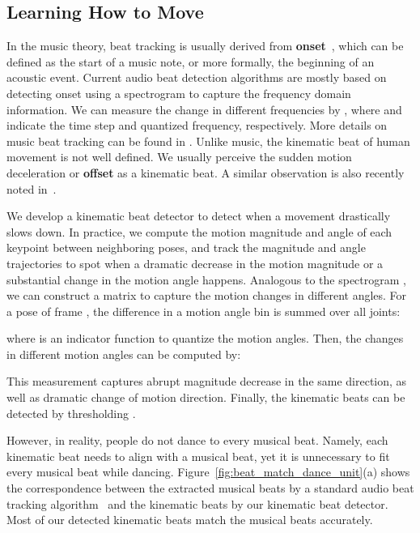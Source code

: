 \documentclass{article}
\newlength\secmargin
\newlength\subsecmargin
\begin{document}
\subsection{Learning How to Move}
\label{subsec:stage1}
\vspace{\subsecmargin}
In the music theory, beat tracking is usually derived from \textbf{onset}~\cite{ellis2007beat}, which can be defined as the start of a music note, or more formally, the beginning of an acoustic event. 
Current audio beat detection algorithms are mostly based on detecting onset using a spectrogram  to capture the frequency domain information.
We can measure the change in different frequencies by , where  and  indicate the time step and quantized frequency, respectively.
More details on music beat tracking can be found in \cite{ellis2007beat}. Unlike music, the kinematic beat of human movement is not well defined.
We usually perceive the sudden motion deceleration or \textbf{offset} as a kinematic beat.
A similar observation is also recently noted in~\cite{davis2018visual}.


We develop a kinematic beat detector to detect when a movement drastically slows down.
In practice, we compute the motion magnitude and angle of each keypoint between neighboring poses, and track the magnitude and angle trajectories to spot when a dramatic decrease in the motion magnitude or a substantial change in the motion angle happens.
Analogous to the spectrogram , we can construct a matrix  to capture the motion changes in different angles.
For a pose  of frame , the difference in a motion angle bin  is summed over all joints: 

where  is an indicator function to quantize the motion angles.
Then, the changes in different motion angles can be computed by:

This measurement captures abrupt magnitude decrease in the same direction, as well as dramatic change of motion direction.
Finally, the kinematic beats can be detected by thresholding .

However, in reality, people do not dance to every musical beat. 
Namely, each kinematic beat needs to align with a musical beat, yet it is unnecessary to fit every musical beat while dancing.
Figure~\ref{fig:beat_match_dance_unit}(a) shows the correspondence between the extracted musical beats by a standard audio beat tracking algorithm~\cite{ellis2007beat} and the kinematic beats by our kinematic beat detector. 
Most of our detected kinematic beats match the musical beats accurately.
\end{document}
